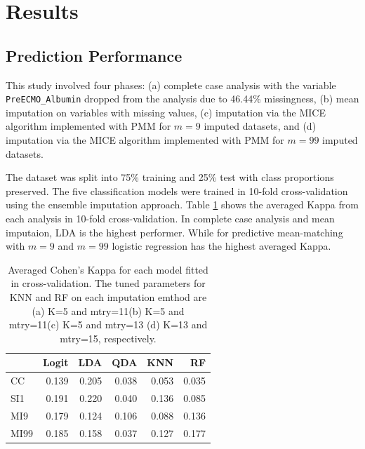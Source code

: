 \documentclass[12pt,]{article}
\begin{document}
\newpage

\section{Results}\label{results}

\subsection{Prediction Performance}\label{prediction-performance}

This study involved four phases: (a) complete case analysis with the
variable \texttt{PreECMO\_Albumin} dropped from the analysis due to
46.44\% missingness, (b) mean imputation on variables with missing
values, (c) imputation via the MICE algorithm implemented with PMM for
\(m=9\) imputed datasets, and (d) imputation via the MICE algorithm
implemented with PMM for \(m=99\) imputed datasets.

The dataset was split into 75\% training and 25\% test with class
proportions preserved. The five classification models were trained in
10-fold cross-validation using the ensemble imputation approach. Table
\ref{tab:cv-kappa} shows the averaged Kappa from each analysis in
10-fold cross-validation. In complete case analysis and mean imputaion,
LDA is the highest performer. While for predictive mean-matching with
\(m=9\) and \(m=99\) logistic regression has the highest averaged Kappa.

\begin{table}[!h]

\caption{\label{tab:unnamed-chunk-6}\label{tab:cv-kappa} Averaged Cohen's Kappa for each model fitted in cross-validation.  The tuned parameters for KNN and RF on each imputation emthod are (a) K=5 and mtry=11(b) K=5 and mtry=11(c) K=5 and mtry=13 (d) K=13 and mtry=15, respectively.}
\centering
\fontsize{10}{12}\selectfont
\begin{tabular}{lrrrrr}
\toprule
  & Logit & LDA & QDA & KNN & RF\\
\midrule
CC & 0.139 & 0.205 & 0.038 & 0.053 & 0.035\\
SI1 & 0.191 & 0.220 & 0.040 & 0.136 & 0.085\\
MI9 & 0.179 & 0.124 & 0.106 & 0.088 & 0.136\\
MI99 & 0.185 & 0.158 & 0.037 & 0.127 & 0.177\\
\bottomrule
\end{tabular}
\end{table}
\end{document}
